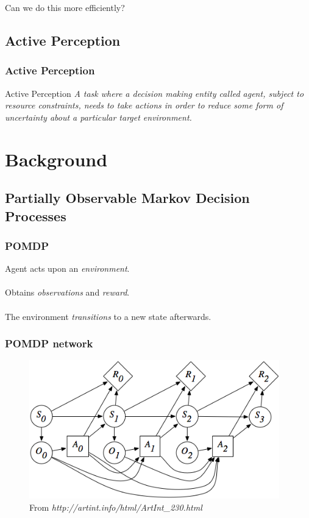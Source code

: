 \documentclass[xcolor={dvipsnames}]{beamer}
\begin{document}
\begin{frame}
Can we do this more efficiently?
\end{frame}

\subsection{Active Perception}
\begin{frame}
\frametitle{Active Perception}
\begin{block}{Active Perception}
\textit{A task where a decision making entity called agent, subject to resource
constraints, needs to take actions in order to reduce some form of uncertainty about a particular
target environment.}
\end{block}
\end{frame}

\section{Background} %

\subsection{Partially Observable Markov Decision Processes}

\begin{frame}
\frametitle{POMDP}
\begin{block}{}
Agent acts upon an \textit{environment}.  \\~\\
Obtains \textit{observations} and \textit{reward}. \\~\\
The environment \textit{transitions} to a new state afterwards.
\end{block}
\end{frame}

\begin{frame}
\frametitle{POMDP network}
\begin{figure}
\centerline{\includegraphics[height=6cm]{images/pomdp.png}}
\caption{From \textit{http://artint.info/html/ArtInt\_230.html}}
\end{figure}
\end{frame}
\end{document}
